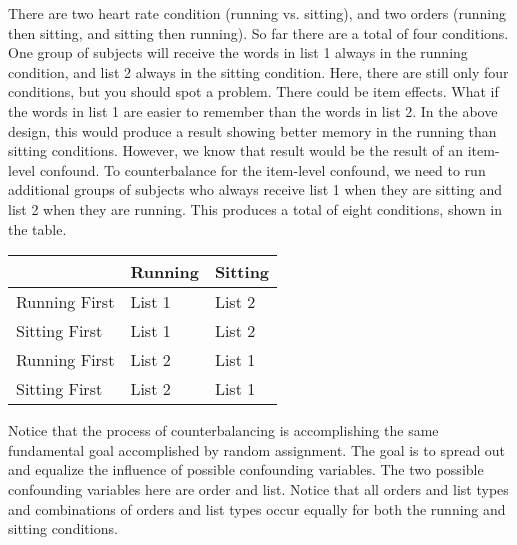 There are two heart rate condition (running vs. sitting), and two orders (running then sitting, and sitting then running). So far there are a total of four conditions. One group of subjects will receive the words in list 1 always in the running condition, and list 2 always in the sitting condition. Here, there are still only four conditions, but you should spot a problem. There could be item effects. What if the words in list 1 are easier to remember than the words in list 2. In the above design, this would produce a result showing better memory in the running than sitting conditions. However, we know that result would be the result of an item-level confound. To counterbalance for the item-level confound, we need to run additional groups of subjects who always receive list 1 when they are sitting and list 2 when they are running. This produces a total of eight conditions, shown in the table.

\begin{table}[]
\centering
\label{my-label}
\begin{tabular}{lll}
\hline
              & Running & Sitting \\ \hline
Running First & List 1  & List 2  \\ \cline{1-1}
Sitting First & List 1  & List 2  \\ \cline{1-1}
Running First & List 2  & List 1  \\ \cline{1-1}
Sitting First & List 2  & List 1  \\ \cline{1-1}
\end{tabular}
\end{table}

Notice that the process of counterbalancing is accomplishing the same fundamental goal accomplished by random assignment. The goal is to spread out and equalize the influence of possible confounding variables. The two possible confounding variables here are order and list. Notice that all orders and list types and combinations of orders and list types occur equally for both the running and sitting conditions.
